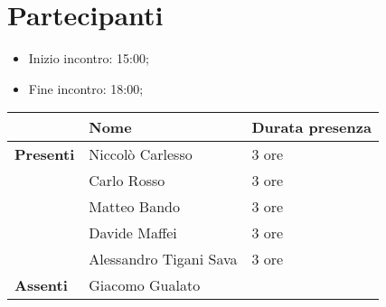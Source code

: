 \section{Partecipanti}

\begin{itemize}
    \item Inizio incontro: 15:00;
    \item Fine incontro: 18:00;
\end{itemize}


\begin{center}
{\renewcommand{\arraystretch}{1.5}
\begin{tabular}{lll}
	                    & \textbf{Nome}  			& \textbf{Durata presenza} \\
	\hline
	\textbf{Presenti}   & Niccolò Carlesso          & 3 ore						\\
						& Carlo Rosso 				& 3 ore 					\\
						& Matteo Bando 				& 3 ore 					\\
						& Davide Maffei 			& 3 ore 					\\
						& Alessandro Tigani Sava 	& 3 ore 					\\ 
	\hline
	\textbf{Assenti}	& Giacomo Gualato           &      						\\
\end{tabular}	
}
\end{center}